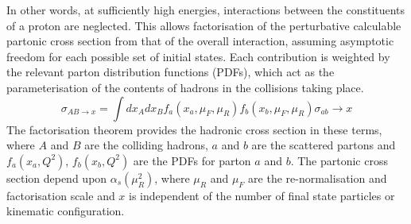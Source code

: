 In other words, at sufficiently high energies, interactions between the constituents of a proton are neglected. This allows factorisation of the perturbative calculable partonic cross section from that of the overall interaction, assuming asymptotic freedom for each possible set of initial states. Each contribution is weighted by the relevant parton distribution functions (PDFs), which act as the parameterisation of the contents of hadrons in the collisions taking place.
\begin{equation}
\sigma_{AB\rightarrow x}=\int dx_{A}dx_{B}f_{a}(x_{a},\mu_{F},\mu_{R})f_{b}(x_{b},\mu_{F},\mu_{R})\sigma_{ab}\rightarrow x
\end{equation}
The factorisation theorem provides the hadronic cross section in these terms, where $A$ and $B$ are the colliding hadrons, $a$ and $b$ are the scattered partons and $f_{a}(x_{a},Q^{2})$, $f_{b}(x_{b},Q^{2})$ are the PDFs for parton $a$ and $b$. The partonic cross section depend upon $\alpha_{s}(\mu_{R}^{2})$, where $\mu_{R}$ and $\mu_{F}$ are the re-normalisation and factorisation scale and $x$ is independent of the number of final state particles or kinematic configuration.


